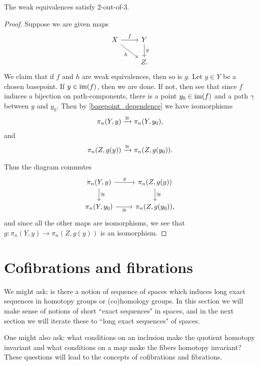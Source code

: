 \documentclass{article}[11pt]
\begin{document}
\begin{proposition} The weak equivalences satisfy 2-out-of-3.
\end{proposition}
\begin{proof} Suppose we are given maps
\[
	\begin{tikzcd}
	X\rar["f" above]\ar[dr,"h" below left] & Y\dar["g" right] \\
	 & Z.
	\end{tikzcd}
\]
We claim that if $f$ and $h$ are weak equivalences, then so is $g$. Let $y \in Y$ be a chosen basepoint. If $y\in \text{im}(f)$, then we are done. If not, then see that since $f$ induces a bijection on path-components, there is a point $y_0 \in \text{im}(f)$ and a path $\gamma$ between $y$ and $y_0$. Then by \autoref{basepoint_dependence} we have  isomorphisms
\begin{align*}
	\pi_n(Y,y) \xrightarrow{\cong} \pi_n(Y,y_0),
\end{align*}
and 
\begin{align*}
	\pi_n(Z,g(y)) \xrightarrow{\cong} \pi_n(Z,g(y_0)).
\end{align*}

Thus the diagram commutes
\[
	\begin{tikzcd}
	\pi_n(Y,y)\dar["\cong"]\rar["g" above] & \pi_n(Z,g(y))\dar["\cong"] \\
	\pi_n(Y,y_0)\rar["\cong" below] & \pi_n(Z,g(y_0)),
	\end{tikzcd}
\]
and since all the other maps are isomorphisms, we see that $g\colon \pi_n(Y,y) \to \pi_n(Z,g(y))$ is an isomorphism.

\end{proof}



	
	

\section{Cofibrations and fibrations}
We might ask: is there a notion of sequence of spaces which induces long exact sequences in homotopy groups or (co)homology groups. In this section we will make sense of  notions of short ``exact sequences" in spaces, and in the next section we will iterate these to ``long exact sequences" of spaces.

One might also ask: what conditions on an inclusion make the quotient homotopy invariant and what conditions on a map make the fibers homotopy invariant? These questions will lead to the concepts of cofibrations and fibrations.
\end{document}

